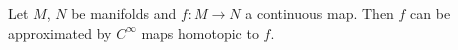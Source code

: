 Let $M$, $N$ be manifolds and $f \colon M \to N$ a continuous map. Then $f$ can be approximated by $C^{\infty}$ maps homotopic to $f$.
